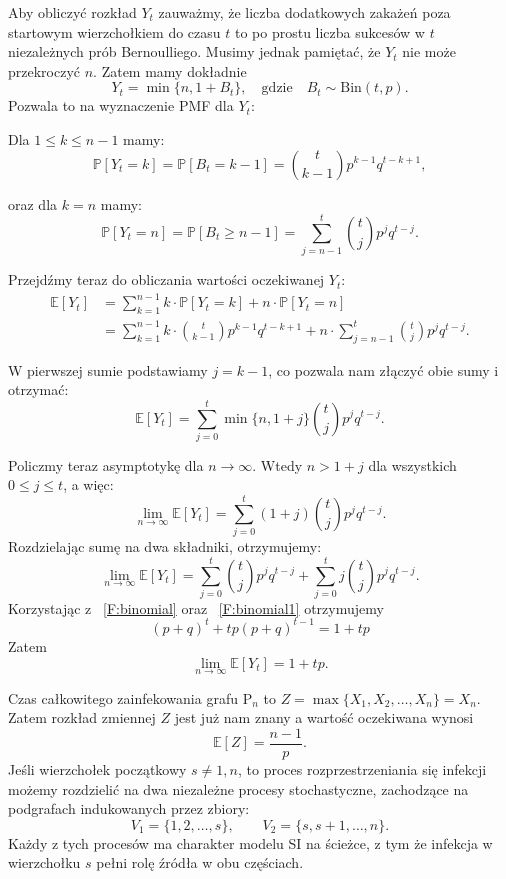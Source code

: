 Aby obliczyć rozkład $Y_t$ zauważmy, że liczba dodatkowych zakażeń poza startowym wierzchołkiem do czasu $t$ to po prostu liczba sukcesów w $t$ niezależnych prób Bernoulliego. Musimy jednak pamiętać, że $Y_t$ nie może przekroczyć $n$. Zatem mamy dokładnie
\[
Y_t = \min\{n, 1 + B_t\}, \quad \text{gdzie} \quad B_t \sim \mathrm{Bin}(t,p).
\]
Pozwala to na wyznaczenie PMF dla $Y_t$:

Dla $1 \le k \le n-1$ mamy:
\[
\mathbb{P}[Y_t=k] = \mathbb{P}[B_t=k-1] = \binom{t}{k-1} p^{k-1} q^{t-k+1},
\]  

oraz dla $k = n$ mamy:
\[
\mathbb{P}[Y_t=n] = \mathbb{P}[B_t \ge n-1] = \sum_{j=n-1}^{t} \binom{t}{j} p^j q^{t-j}.
\]

Przejdźmy teraz do obliczania wartości oczekiwanej $Y_t$:
\begin{align*}
\mathbb{E}[Y_t] 
&= \sum_{k=1}^{n-1} k \cdot \mathbb{P}[Y_t=k] + n \cdot \mathbb{P}[Y_t=n] \\
&= \sum_{k=1}^{n-1} k \cdot \binom{t}{k-1} p^{k-1} q^{t-k+1} 
   + n \cdot \sum_{j=n-1}^{t} \binom{t}{j} p^j q^{t-j}.
\end{align*}

W pierwszej sumie podstawiamy $j = k-1$, co pozwala nam złączyć obie sumy i otrzymać:
\[
    \mathbb{E}[Y_t] = \sum_{j=0}^{t} \min\{n, 1+j\} \binom{t}{j} p^j q^{t-j}.
\]

Policzmy teraz asymptotykę dla $n \to \infty$. Wtedy $n > 1 + j$ dla wszystkich $0 \le j \le t$, a więc:
\[
    \lim_{n \to \infty}\mathbb{E}[Y_t] = \sum_{j=0}^{t} (1+j) \binom{t}{j} p^j q^{t-j}.
\]
Rozdzielając sumę na dwa składniki, otrzymujemy:
\[
    \lim_{n \to \infty}\mathbb{E}[Y_t] = \sum_{j=0}^{t} \binom{t}{j} p^j q^{t-j} 
+ \sum_{j=0}^{t} j \binom{t}{j} p^j q^{t-j}.
\]
Korzystając z ~\ref{F:binomial} oraz ~\ref{F:binomial1} otrzymujemy
\[
    (p+q)^t+tp(p+q)^{t-1}=1+tp
\]
Zatem
\[
    \lim_{n \to \infty}\mathbb{E}[Y_t] = 1+tp.
\]

Czas całkowitego zainfekowania grafu $\mathrm{P}_n$ to $Z = \max\{X_1,X_2,\dots,X_n\} = X_n$. Zatem rozkład zmiennej $Z$ jest już nam znany a wartość oczekiwana wynosi 
\[
    \mathbb{E}[Z]=\frac{n-1}{p}.
\]
\noindent
Jeśli wierzchołek początkowy $s \ne 1, n$, to proces rozprzestrzeniania się infekcji możemy rozdzielić na dwa niezależne procesy stochastyczne, 
zachodzące na podgrafach indukowanych przez zbiory:
\[
V_1 = \{1, 2, \dots, s\}, \qquad 
V_2 = \{s, s+1, \dots, n\}.
\]
Każdy z tych procesów ma charakter modelu SI na ścieżce, 
z tym że infekcja w wierzchołku $s$ pełni rolę źródła w obu częściach.


